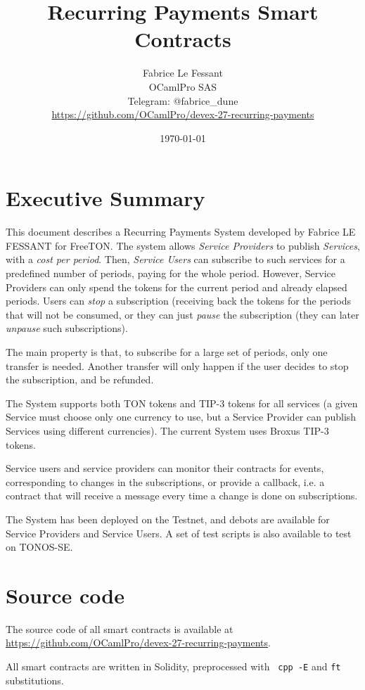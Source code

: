 \documentclass[10pt,a4paper]{article}
\author{Fabrice Le Fessant\\OCamlPro SAS\\Telegram: @fabrice\_dune\\ \small{\url{https://github.com/OCamlPro/devex-27-recurring-payments}}}
\title{Recurring Payments Smart Contracts}
\date{\today}
\begin{document}
\maketitle

\section{Executive Summary}

This document describes a Recurring Payments System developed by
Fabrice LE FESSANT for FreeTON. The system allows {\em Service
  Providers} to publish {\em Services}, with a {\em cost per
  period}. Then, {\em Service Users} can subscribe to such services
for a predefined number of periods, paying for the whole
period. However, Service Providers can only spend the tokens for the
current period and already elapsed periods. Users can {\em stop} a
subscription (receiving back the tokens for the periods that will not
be consumed, or they can just {\em pause} the subscription (they can
later {\em unpause} such subscriptions).

The main property is that, to subscribe for a large set of periods,
only one transfer is needed. Another transfer will only happen if the
user decides to stop the subscription, and be refunded.

The System supports both TON tokens and TIP-3 tokens for all services
(a given Service must choose only one currency to use, but a Service
Provider can publish Services using different currencies). The current
System uses Broxus TIP-3 tokens.

Service users and service providers can monitor their contracts for
events, corresponding to changes in the subscriptions, or provide a
callback, i.e. a contract that will receive a message every time a
change is done on subscriptions.

The System has been deployed on the Testnet, and debots are available
for Service Providers and Service Users. A set of test scripts is also
available to test on TONOS-SE.

\tableofcontents

\section{Source code}

The source code of all smart contracts is available at
\url{https://github.com/OCamlPro/devex-27-recurring-payments}.

All smart contracts are written in Solidity, preprocessed with {\tt
  cpp -E} and {\tt ft} substitutions.
\end{document}
